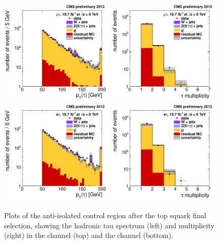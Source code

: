 \begin{figure}[hbtp]
  \begin{center}
    \includegraphics[width=0.49\textwidth]{figures/bkgEstim/pttauantiisoall_mutau_lqd321.pdf}
    \includegraphics[width=0.49\textwidth]{figures/bkgEstim/ntauantiiso_mutau_lqd321.pdf} \\
    \includegraphics[width=0.49\textwidth]{figures/bkgEstim/pttauantiisoall_etau_lqd321.pdf}
    \includegraphics[width=0.49\textwidth]{figures/bkgEstim/ntauantiiso_etau_lqd321.pdf}
    \caption{Plots of the anti-isolated control region after the top squark final selection, showing the hadronic tau \pt spectrum (left) and multiplicity (right) in the \mutau channel (top) and the \etau channel (bottom). \label{Bkg:fig:antiiso-lqd321}}
  \end{center}
\end{figure}

